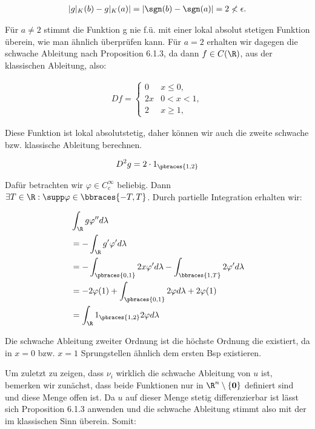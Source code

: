 \begin{solution}
\begin{align*}
  |g|_K(b) - g|_K(a)| = |\sgn(b) - \sgn(a)| = 2 \nless \epsilon.
\end{align*}

Für $a \neq 2$ stimmt die Funktion g nie f.ü. mit einer lokal absolut stetigen
Funktion überein, wie man ähnlich überprüfen kann. Für $a=2$ erhalten wir
dagegen die schwache Ableitung nach Proposition 6.1.3, da dann $f\in C(\R)$,
aus der klassischen Ableitung, also:

\begin{align*}
  Df =
  \begin{cases}
    0  & x \leq 0,  \\
    2x & 0 < x < 1, \\
    2  & x \geq 1,
  \end{cases}
\end{align*}

Diese Funktion ist lokal absolutstetig, daher können wir auch die zweite schwache bzw. klassische Ableitung berechnen.

\begin{align*}
  D^2g = 2\cdot 1_{\pbraces{1,2}}
\end{align*}

Dafür betrachten wir $\varphi \in C^{\infty}_c$ beliebig. Dann
$\exists T \in \R: \supp \varphi \in \bbraces{-T,T}$. Durch partielle
Integration erhalten wir:

\begin{align*}
    & \int_{\R}g\varphi^{\prime\prime}d\lambda \\
    & = - \int_{\R}g^{\prime}\varphi^{\prime}d\lambda \\
    & = - \int_{\pbraces{0,1}} 2x\varphi^{\prime}d\lambda -
      \int_{\bbraces{1,T}} 2\varphi^{\prime}d\lambda \\
    & = -2\varphi(1) + \int_{\pbraces{0,1}}2\varphi d\lambda +2\varphi(1) \\
    & = \int_{\R}1_{\pbraces{1,2}}2\varphi d\lambda
\end{align*}

Die schwache Ableitung zweiter Ordnung ist die höchste Ordnung die existiert,
da in $x=0$ bzw. $x=1$ Sprungstellen ähnlich dem ersten Bsp existieren.


Um zuletzt zu zeigen, dass $\nu_i$ wirklich die schwache Ableitung von $u$ ist,
bemerken wir zunächst, dass beide Funktionen nur in $\R^{n} \setminus \{
\textbf{0} \}$
definiert sind und diese Menge offen ist. Da $u$ auf dieser Menge
stetig differenzierbar ist lässt sich Proposition 6.1.3 anwenden und die schwache
Ableitung stimmt also mit der im klassischen Sinn überein. Somit:


\end{solution}

